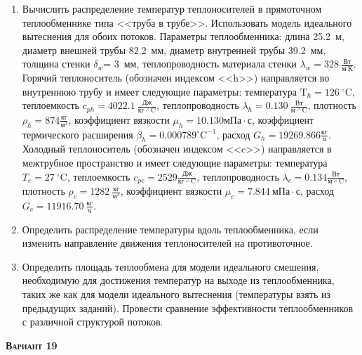 \begin{enumerate} 
\item Вычислить распределение температур теплоносителей в прямоточном теплообменнике типа <<труба в трубе>>. Использовать модель идеального вытеснения для обоих потоков. Параметры теплообменника: длина  25.2~м, диаметр внешней трубы 82.2~мм,  диаметр внутренней трубы 39.2~мм, толщина стенки $\delta_{w}$=     3~мм,  теплопроводность материала стенки $\lambda_{w}=  328~\frac{\text{Вт}}{\text{м} \cdot \text{К}}$.  Горячий теплоноситель (обозначен индексом <<h>>) направляется во внутреннюю трубу и	 имеет следующие параметры: температура $\text{T}_{h}= 126~^\circ\mathrm{C}$, теплоемкость	  $c_{p{h}}= 4022.1~\frac{\text{Дж}}{\text{кг} \cdot ^\circ\mathrm{C}}$, теплопроводность 		$\lambda_{h}= 0.130~\frac{\text{Вт}}{\text{м} \cdot ^\circ\mathrm{C}}$, плотность 		$\rho_{h}=  874 \frac{\text{кг}}{\text{м}^3}$, коэффициент вязкости $\mu_{h}=10.130 \text{мПа} 		\cdot \text{с} $, коэффициент термического расширения $\beta_{h}=0.000789 ^\circ\mathrm{C}^{-1}$,		 расход $G_{h}= 19269.866 \frac{\text{кг}}{\text{ч}}$. Холодный теплоноситель (обозначен индексом <<c>>) 		 направляется в межтрубное пространство и имеет следующие параметры: температура $T_{c}=   27		 ~^\circ\mathrm{C}$, теплоемкость $c_{p{c}}= 2529 \frac{\text{Дж}}{\text{кг} \cdot ^\circ\mathrm{C}}$,			 теплопроводность $\lambda_{c}=0.134 \frac{\text{Вт}}{\text{м} \cdot ^\circ\mathrm{C}}$, плотность 			 $\rho_{c}=  1282~\frac{\text{кг}}{\text{м}^3}$, коэффициент вязкости $\mu_{c}=7.844~\text{мПа} \cdot \text{с} $, 			 расход $G_{c}=11916.70~\frac{\text{кг}}{\text{ч}}$. 

\item Определить распределение температуры вдоль теплообменника, если 	изменить направление движения теплоносителей на противоточное.

\item Определить площадь теплообмена для модели идеального смешения, необходимую для достижения 	температур на выходе из теплообменника, таких же как для модели идеального вытеснения (температуры взять из предыдущих заданий).	Провести сравнение эффективности теплообменников с различной структурой потоков.

\end{enumerate}

\textsc{\textbf{Вариант 19}}

